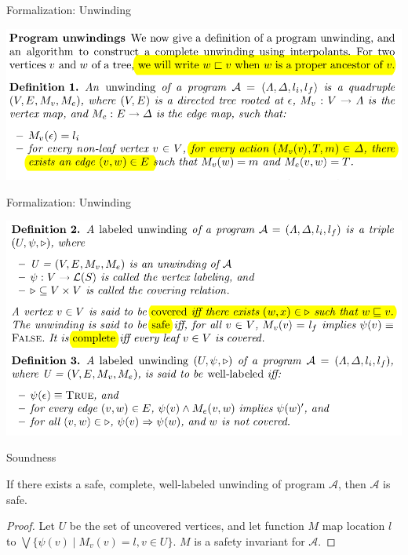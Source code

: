 \documentclass[aspectratio=1610, 13pt]{beamer}
\begin{document}
\begin{frame}{Formalization: Unwinding}
\begin{center}
\includegraphics[scale=0.4]{3.png}
\end{center}
\end{frame}\begin{frame}{Formalization: Unwinding}
\begin{center}
\includegraphics[scale=0.4]{4.png}
\end{center}
\end{frame}

\begin{frame}{Soundness}
\begin{theorem}[Soundness]
If there exists a safe, complete, well-labeled  unwinding of program $\mathcal{A}$, then $\mathcal{A}$ is safe.
\end{theorem}
\begin{proof}
Let $U$ be the set of uncovered vertices, and let function $M$ map location $l$ to $\bigvee \{\psi(v)\mid M_v(v) = l, v\in U\}$. $M$ is a safety invariant for $\mathcal{A}$.
\end{proof}


\end{frame}
\end{document}
